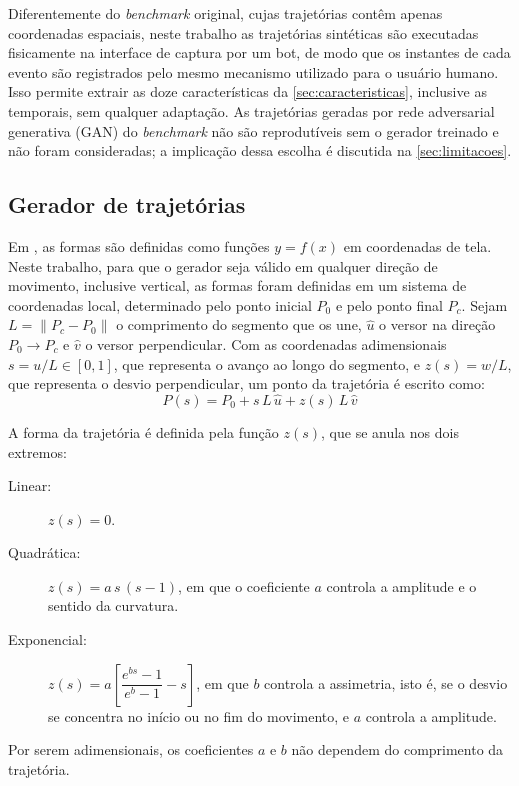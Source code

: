Diferentemente do \textit{benchmark} original, cujas trajetórias contêm apenas coordenadas espaciais, neste trabalho as trajetórias sintéticas são executadas fisicamente na interface de captura por um bot, de modo que os instantes de cada evento são registrados pelo mesmo mecanismo utilizado para o usuário humano. Isso permite extrair as doze características da \autoref{sec:caracteristicas}, inclusive as temporais, sem qualquer adaptação. As trajetórias geradas por rede adversarial generativa (GAN) do \textit{benchmark} não são reprodutíveis sem o gerador treinado e não foram consideradas; a implicação dessa escolha é discutida na \autoref{sec:limitacoes}.

\subsection{Gerador de trajetórias}

Em , as formas são definidas como funções $y = f(x)$ em coordenadas de tela. Neste trabalho, para que o gerador seja válido em qualquer direção de movimento, inclusive vertical, as formas foram definidas em um sistema de coordenadas local, determinado pelo ponto inicial $P_0$ e pelo ponto final $P_c$. Sejam $L = \|P_c - P_0\|$ o comprimento do segmento que os une, $\hat{u}$ o versor na direção $P_0 \to P_c$ e $\hat{v}$ o versor perpendicular. Com as coordenadas adimensionais $s = u/L \in [0, 1]$, que representa o avanço ao longo do segmento, e $z(s) = w/L$, que representa o desvio perpendicular, um ponto da trajetória é escrito como:
\begin{equation}
    P(s) = P_0 + s\,L\,\hat{u} + z(s)\,L\,\hat{v}
    \label{eq:trajetoria_local}
\end{equation}

A forma da trajetória é definida pela função $z(s)$, que se anula nos dois extremos:
\begin{description}
    \item[Linear:] $z(s) = 0$.
    \item[Quadrática:] $z(s) = a\,s\,(s - 1)$, em que o coeficiente $a$ controla a amplitude e o sentido da curvatura.
    \item[Exponencial:] $z(s) = a \left[ \dfrac{e^{b s} - 1}{e^{b} - 1} - s \right]$, em que $b$ controla a assimetria, isto é, se o desvio se concentra no início ou no fim do movimento, e $a$ controla a amplitude.
\end{description}
Por serem adimensionais, os coeficientes $a$ e $b$ não dependem do comprimento da trajetória.


